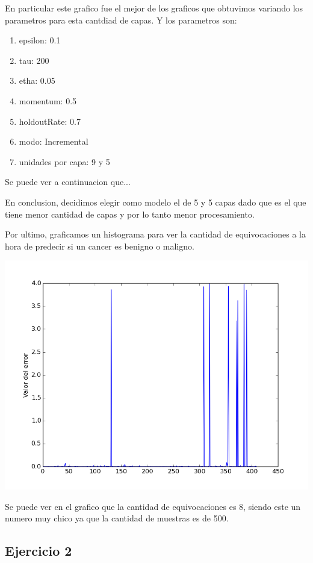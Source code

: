 En particular este grafico fue el mejor de los graficos que obtuvimos variando los parametros para esta cantdiad de capas. Y los parametros son:
\begin{enumerate}
\item epsilon: 0.1
\item tau: 200
\item etha: 0.05
\item momentum: 0.5
\item holdoutRate: 0.7
\item modo: Incremental
\item unidades por capa: 9 y 5
\end{enumerate}

Se puede ver a continuacion que...

En conclusion, decidimos elegir como modelo el de 5 y 5 capas dado que es el que tiene menor cantidad de capas y por lo tanto menor procesamiento.

Por ultimo, graficamos un histograma para ver la cantidad de equivocaciones a la hora de predecir si un cancer es benigno o maligno.

\includegraphics[scale=0.7]{img/histogramaej155}

Se puede ver en el grafico que la cantidad de equivocaciones es 8, siendo este un numero muy chico ya que la cantidad de muestras es de 500.


\subsection{Ejercicio 2}

